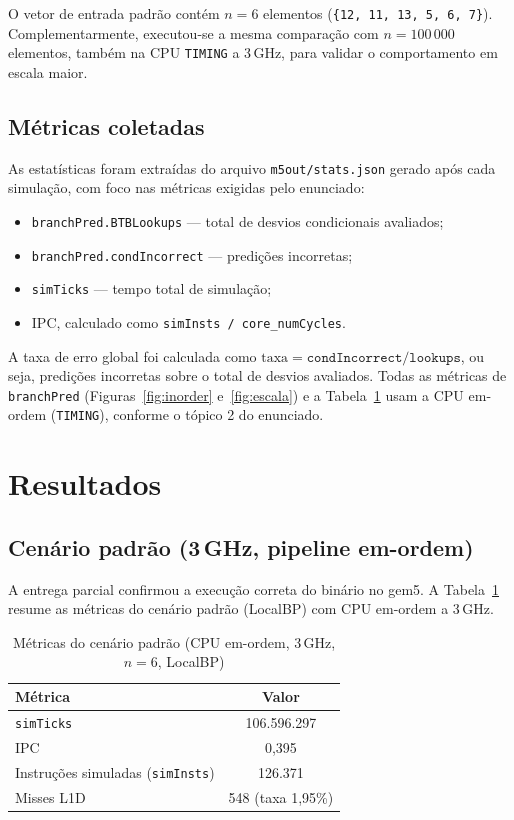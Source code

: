 \documentclass[12pt]{article}
\begin{document}
O vetor de entrada padrão contém $n = 6$ elementos (\texttt{\{12, 11, 13, 5, 6, 7\}}). Complementarmente, executou-se a mesma comparação com $n = 100\,000$ elementos, também na CPU \texttt{TIMING} a 3\,GHz, para validar o comportamento em escala maior.

\subsection{Métricas coletadas}

As estatísticas foram extraídas do arquivo \texttt{m5out/stats.json} gerado após cada simulação, com foco nas métricas exigidas pelo enunciado:

\begin{itemize}
  \item \texttt{branchPred.BTBLookups} --- total de desvios condicionais avaliados;
  \item \texttt{branchPred.condIncorrect} --- predições incorretas;
  \item \texttt{simTicks} --- tempo total de simulação;
  \item IPC, calculado como \texttt{simInsts / core\_numCycles}.
\end{itemize}

A taxa de erro global foi calculada como $\text{taxa} = \texttt{condIncorrect} / \texttt{lookups}$, ou seja, predições incorretas sobre o total de desvios avaliados. Todas as métricas de \texttt{branchPred} (Figuras~\ref{fig:inorder} e~\ref{fig:escala}) e a Tabela~\ref{tab:baseline} usam a CPU em-ordem (\texttt{TIMING}), conforme o tópico 2 do enunciado.

\section{Resultados}

\subsection{Cenário padrão (3\,GHz, pipeline em-ordem)}

A entrega parcial confirmou a execução correta do binário no gem5. A Tabela~\ref{tab:baseline} resume as métricas do cenário padrão (LocalBP) com CPU em-ordem a 3\,GHz.

\begin{table}[ht]
\centering
\caption{Métricas do cenário padrão (CPU em-ordem, 3\,GHz, $n=6$, LocalBP)}
\label{tab:baseline}
\begin{tabular}{lc}
\toprule
\textbf{Métrica} & \textbf{Valor} \\
\midrule
\texttt{simTicks} & 106.596.297 \\
IPC & 0,395 \\
Instruções simuladas (\texttt{simInsts}) & 126.371 \\
Misses L1D & 548 (taxa 1,95\%) \\
\bottomrule
\end{tabular}
\end{table}
\end{document}
